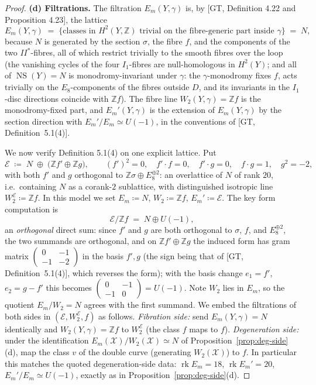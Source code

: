 \documentclass[11pt]{article}
\newcommand{\X}{\mathcal{X}}
\newcommand{\bZ}{\mathbb{Z}}
\newcommand{\cE}{\mathcal{E}}
\DeclareMathOperator{\rk}{rk}
\DeclareMathOperator{\NS}{NS}
\begin{document}
\begin{proof}
\textbf{(d) Filtrations.} The filtration $E_m(Y,\gamma)$ is, by
[GT, Definition 4.22 and Proposition 4.23], the lattice
\[
E_m(Y,\gamma) \;=\;
\bigl\{ \text{classes in } H^2(Y,\bZ) \text{ trivial on the fibre-generic
part inside } \gamma \bigr\}
\;=\; N,
\]
because $N$ is generated by the section $\sigma$, the fibre $f$, and the
components of the two $II^*$-fibres, all of which restrict trivially to the
smooth fibres over the loop (the vanishing cycles of the four $I_1$-fibres
are null-homologous in $H^2(Y)$; and all of $\NS(Y)=N$ is
monodromy-invariant under $\gamma$: the $\gamma$-monodromy fixes
$f$, acts trivially on the $E_8$-components of the fibres outside $D$, and
its invariants in the $I_1$-disc directions coincide with $\bZ f$). The
fibre line $W_2(Y,\gamma)=\bZ f$ is the monodromy-fixed part, and
$E_m'(Y,\gamma)$ is the extension of $E_m(Y,\gamma)$ by the section
direction with $E_m'/E_m\simeq U(-1)$, in the conventions of
[GT, Definition~5.1(4)].

\smallskip

We now verify Definition 5.1(4) on one explicit lattice. Put
\[
\cE \;\coloneqq\; N\;\oplus\;\bigl(\bZ f'\oplus\bZ g\bigr),
\qquad
(f')^2=0,\quad f'\cdot f=0,\quad f'\cdot g=0,\quad
f\cdot g=1,\quad g^2=-2,
\]
with both $f'$ and $g$ orthogonal to
$\bZ\sigma\oplus E_8^{\oplus2}$: an overlattice of $N$ of rank $20$,
i.e.\ containing $N$ as a corank-$2$ sublattice, with distinguished
isotropic line $W_2^{\cE}\coloneqq\bZ f$. In this model we set
$E_m\coloneqq N$, $W_2\coloneqq\bZ f$, $E_m'\coloneqq\cE$. The key
form computation is
\[
\cE/\bZ f \;=\; N\oplus U(-1),
\]
an \emph{orthogonal} direct sum: since $f'$ and $g$ are both orthogonal
to $\sigma$, $f$, and $E_8^{\oplus2}$, the two summands are orthogonal,
and on $\bZ f'\oplus\bZ g$ the induced form has gram matrix
$\begin{pmatrix} 0 & -1\\ -1 & -2\end{pmatrix}$
in the basis $f',g$ (the sign being that of [GT, Definition~5.1(4)],
which reverses the form); with the basis change $e_1=f'$, $e_2=g-f'$
this becomes
$\begin{pmatrix} 0 & -1\\ -1 & 0\end{pmatrix}=U(-1)$.
Note $W_2$ lies in $E_m$, so the quotient $E_m/W_2=N$ agrees with the
first summand. We embed the filtrations of both sides in
$(\cE,W_2^{\cE},f)$ as follows.
\emph{Fibration side:} send $E_m(Y,\gamma)=N$ identically and
$W_2(Y,\gamma)=\bZ f$ to $W_2^{\cE}$ (the class $f$ maps to $f$).
\emph{Degeneration side:} under the identification
$E_m(\X)/W_2(\X)\simeq N$ of Proposition~\ref{prop:deg-side}(d), map the
class $v$ of the double curve (generating $W_2(\X)$) to $f$. In
particular this matches the quoted degeneration-side data: $\rk E_m=18$,
$\rk E_m'=20$, $E_m'/E_m\simeq U(-1)$, exactly as in
Proposition~\ref{prop:deg-side}(d).


\end{proof}
\end{document}
